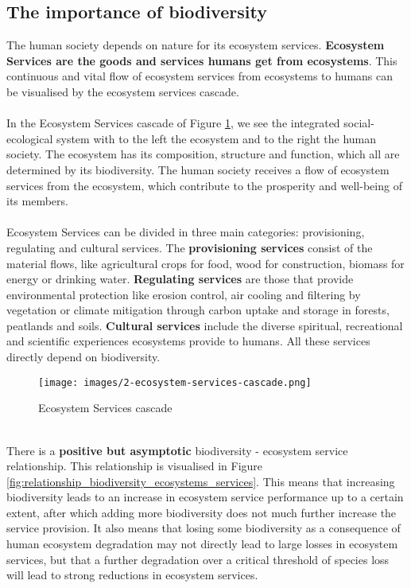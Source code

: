\documentclass[../summary.tex]{subfiles}
\begin{document}
\subsection{The importance of biodiversity}
The human society depends on nature for its ecosystem services. \textbf{Ecosystem Services are the goods and services humans get from ecosystems}. This continuous and vital flow of ecosystem services from ecosystems to humans can be visualised by the ecosystem services cascade.
\\\\
In the Ecosystem Services cascade of Figure \ref{fig:ecosystems_services_cascade}, we see the integrated social-ecological system with to the left the ecosystem and to the right the human society. The ecosystem has its composition, structure and function, which all are determined by its biodiversity. The human society receives a flow of ecosystem services from the ecosystem, which contribute to the prosperity and well-being of its members.
\\\\
Ecosystem Services can be divided in three main categories: provisioning, regulating and cultural services. The \textbf{provisioning services} consist of the material flows, like agricultural crops for food, wood for construction, biomass for energy or drinking water. \textbf{Regulating services} are those that provide environmental protection like erosion control, air cooling and filtering by vegetation or climate mitigation through carbon uptake and storage in forests, peatlands and soils. \textbf{Cultural services} include the diverse spiritual, recreational and scientific experiences ecosystems provide to humans. All these services directly depend on biodiversity.

\begin{figure}[htbp]
	\centering
	\texttt{[image: images/2-ecosystem-services-cascade.png]}
	\caption{Ecosystem Services cascade}
	\label{fig:ecosystems_services_cascade}
\end{figure}

\newpage
\ \\
There is a \textbf{positive but asymptotic} biodiversity - ecosystem service relationship. This relationship is visualised in Figure \ref{fig:relationship_biodiversity_ecosystems_services}. This means that increasing biodiversity leads to an increase in ecosystem service performance up to a certain extent, after which adding more biodiversity does not much further increase the service provision. It also means that losing some biodiversity as a consequence of human ecosystem degradation may not directly lead to large losses in ecosystem services, but that a further degradation over a critical threshold of species loss will lead to strong reductions in ecosystem services.
\end{document}
